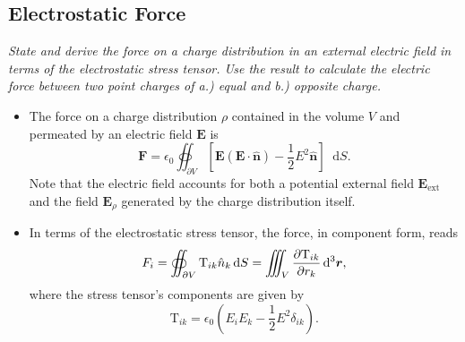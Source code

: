 \documentclass[11pt, a4paper]{article}
\newcommand{\diff}{\mathop{}\!\mathrm{d}} %
\newcommand{\dr}{\diff^{3} \r}  %
\renewcommand{\vec}[1]{\bm{#1}} %
\newcommand{\uvec}[1]{\hat{\vec{#1}}} %
\renewcommand{\r}{\vec{r}}
\newcommand{\E}{\vec{E}} %
\newcommand{\TT}{\mathrm{T}}  %
\newcommand{\ee}{\epsilon_{0}}  %
\begin{document}
    
\subsection{Electrostatic Force}
\textit{State and derive the force on a charge distribution in an external electric field in terms of the electrostatic stress tensor. Use the result to calculate the electric force between two point charges of a.) equal and b.) opposite charge.}

\begin{itemize}
    \item The force on a charge distribution $ \rho $ contained in the volume $ V $ and permeated by an electric field $ \E $ is
    \begin{equation*}
        \vec{F} = \ee \oiint_{\partial V} \left[ \E (\E \cdot \uvec{n}) - \frac{1}{2} E^{2}\uvec{n} \right] \diff S.
    \end{equation*}
    Note that the electric field accounts for both a potential external field $ \E_{\text{ext}} $ and the field $ \E_{\rho} $ generated by the charge distribution itself.

    \item In terms of the electrostatic stress tensor, the force, in component form, reads
    \begin{equation*}
        F_{i} = \oiint_{\partial V} \TT_{ik}\hat{n}_{k}\diff S = \iiint_{V}\pdv{\TT_{ik}}{r_{k}}\dr,
    \end{equation*}
    where the stress tensor's components are given by
    \begin{equation*}
        \TT_{ik} = \ee \left( E_{i}E_{k} - \frac{1}{2}E^{2}\delta_{ik} \right).
    \end{equation*}
    
\end{itemize}
\end{document}
